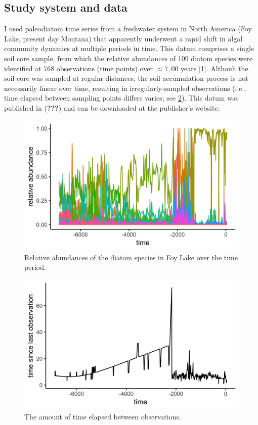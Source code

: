 \documentclass[12pt,twoside,openany]{reedthesis}
\begin{document}
\subsection{Study system and data}\label{study-system-and-data}

I used paleodiatom time series from a freshwater system in North America
(Foy Lake, present day Montana) that apparently underwent a rapid shift
in algal community dynamics at multiple periods in time. This datum
comprises a single soil core sample, from which the relative abundances
of 109 diatom species were identified at 768 observations (time points)
over \(\approx7,00\) years {[}\ref{fig:origDat}{]}. Althouh the soil
core was sampled at regular distances, the soil accumulation process is
not necessarily linear over time, resulting in irregularly-sampled
observations (i.e., time elapsed between sampling points differs varies;
see \ref{fig:timeElapsed}). This datum was published in ({\textbf{???}})
and can be downloaded at the publisher's website.
\begin{figure}

{\centering \includegraphics[width=0.85\linewidth]{./chapterFiles/resampling/figsCalledInDiss/origDataRelAbundance} 

}

\caption{Relative abundances of the diatom species in Foy Lake over the time period.}\label{fig:origDat}
\end{figure}
\begin{figure}

{\centering \includegraphics[width=0.85\linewidth]{./chapterFiles/resampling/figsCalledInDiss/timeElapsed} 

}

\caption{The amount of time elapsed between observations.}\label{fig:timeElapsed}
\end{figure}
\end{document}

